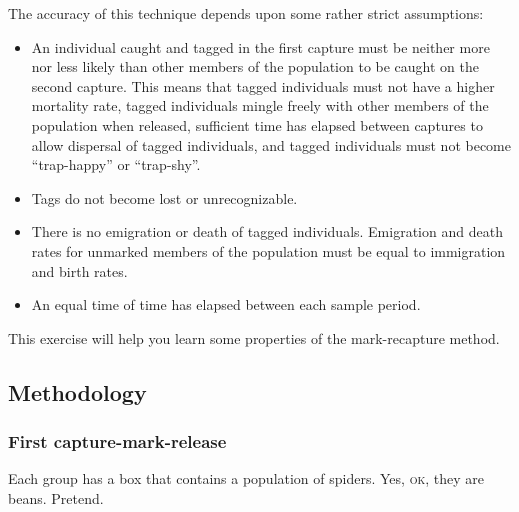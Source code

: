 \documentclass[12pt, hidelinks]{exam}
\begin{document}
The accuracy of this technique depends upon some
rather strict assumptions:

\begin{itemize}[label=\color{black}\textbullet]

\item
  An individual caught and tagged in the first capture must be neither
  more nor less likely than other members of the population to be caught
  on the second capture. This means that tagged individuals must not
  have a higher mortality rate, tagged individuals mingle freely with
  other members of the population when released, sufficient time has
  elapsed between captures to allow dispersal of tagged individuals, and
  tagged individuals must not become ``trap-happy'' or ``trap-shy''.

\item
  Tags do not become lost or unrecognizable.

\item
  There is no emigration or death of tagged individuals. Emigration and
  death rates for unmarked members of the population must be equal to
  immigration and birth rates.
  
  \item An equal time  of time has elapsed between each sample period.

\end{itemize}

This exercise will help you learn some properties of the mark-recapture method.

\subsection*{Methodology}

\subsubsection*{First capture-mark-release}\label{sec:first_mark}

Each group has a box that contains a population of spiders.%
Yes, \textsc{ok}, they are beans. Pretend. %
\end{document}
